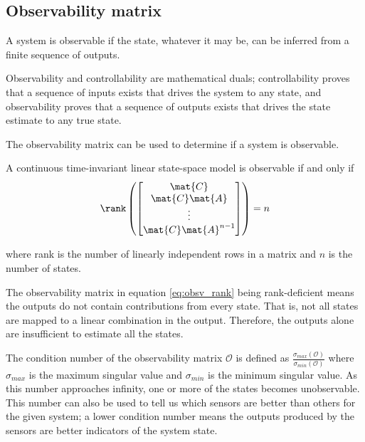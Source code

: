 \subsection{Observability matrix}

A \gls{system} is observable if the \gls{state}, whatever it may be, can be
inferred from a finite sequence of \glspl{output}.

Observability and controllability are mathematical duals; controllability proves
that a sequence of \glspl{input} exists that drives the \gls{system} to any
\gls{state}, and observability proves that a sequence of \glspl{output} exists
that drives the \gls{state} estimate to any true \gls{state}.

The observability matrix can be used to determine if a system is observable.
\begin{theorem}[Observability]
  A continuous \gls{time-invariant} linear state-space \gls{model} is observable
  if and only if
  \begin{equation}
    \rank\left(
    \begin{bmatrix}
      \mat{C} \\
      \mat{C}\mat{A} \\
      \vdots \\
      \mat{C}\mat{A}^{n-1}
    \end{bmatrix}\right) = n \label{eq:obsv_rank}
  \end{equation}

  where rank is the number of linearly independent rows in a matrix and $n$ is
  the number of \glspl{state}.
\end{theorem}

The observability matrix in equation \eqref{eq:obsv_rank} being rank-deficient
means the \glspl{output} do not contain contributions from every \gls{state}.
That is, not all \glspl{state} are mapped to a linear combination in the
\gls{output}. Therefore, the \glspl{output} alone are insufficient to estimate
all the \glspl{state}.

The condition number of the observability matrix $\mathcal{O}$ is defined as
$\frac{\sigma_{max}(\mathcal{O})}{\sigma_{min}(\mathcal{O})}$ where
$\sigma_{max}$ is the maximum singular value and
$\sigma_{min}$ is the minimum singular value. As this number approaches
infinity, one or more of the \glspl{state} becomes unobservable. This number can
also be used to tell us which sensors are better than others for the given
\gls{system}; a lower condition number means the \glspl{output} produced by the
sensors are better indicators of the \gls{system} \gls{state}.

